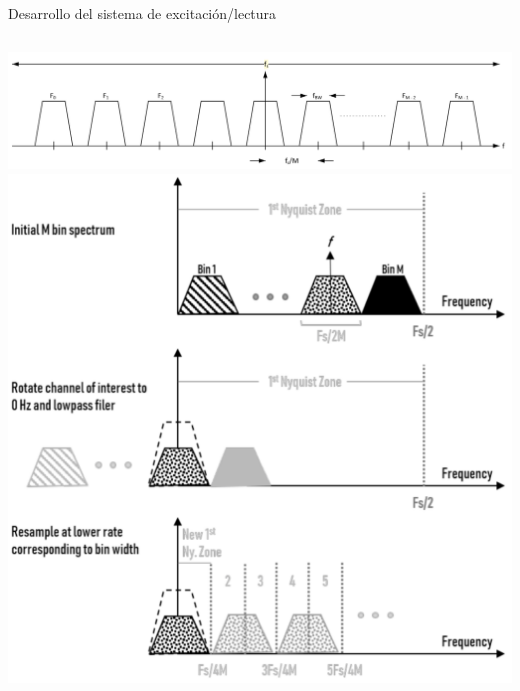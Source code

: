 \documentclass[ignorenonframetext,12pt]{beamer}
\begin{document}
\begin{frame}{Desarrollo del sistema de excitación/lectura}
\begin{columns}
\begin{column}{0.6\textwidth}
					\begin{center}
						\includegraphics[width=\textwidth]{FDM_channel_diagram}
						\includegraphics[width=\textwidth]{pfb_basic1}
					\end{center}
				\end{column}
			\end{columns}
		\end{frame}
\end{document}
